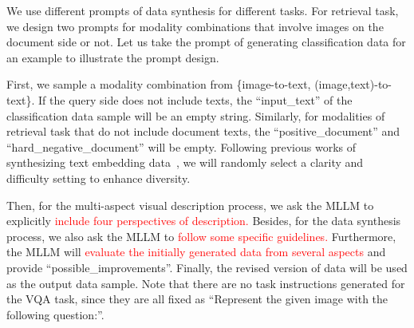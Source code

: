 We use different prompts of data synthesis for different tasks.
For retrieval task, we design two prompts for modality combinations that involve images on the document side or not.
Let us take the prompt of generating classification data for an example to illustrate the prompt design.

First, we sample a modality combination from \{image-to-text, (image,text)-to-text\}.
If the query side does not include texts, the ``input\_text'' of the classification data sample will be an empty string.
Similarly, for modalities of retrieval task that do not include document texts, the ``positive\_document'' and ``hard\_negative\_document'' will be empty.
Following previous works of synthesizing text embedding data~\cite{E5mistral, speed}, we will randomly select a clarity and difficulty setting to enhance diversity.

Then, for the multi-aspect visual description process, we ask the MLLM to explicitly \textcolor{red}{include four perspectives of description.}
Besides, for the data synthesis process, we also ask the MLLM to \textcolor{red}{follow some specific guidelines.}  
Furthermore, the MLLM will \textcolor{red}{evaluate the initially generated data from several aspects} and provide ``possible\_improvements''.
Finally, the revised version of data will be used as the output data sample.
Note that there are no task instructions generated for the VQA task, since they are all fixed as ``Represent the given image with the following question:''.


